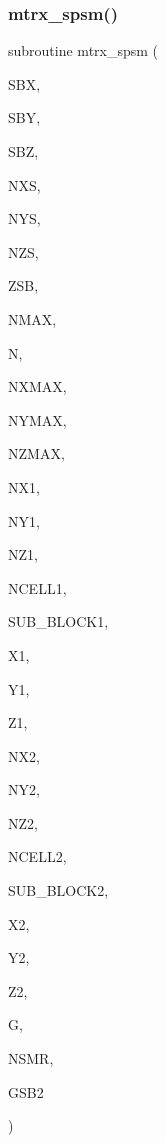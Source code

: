 \subsubsection{\texorpdfstring{mtrx\+\_\+spsm()}{mtrx\_spsm()}}
{\footnotesize\ttfamily subroutine mtrx\+\_\+spsm (\begin{DoxyParamCaption}\item[{real}]{S\+BX,  }\item[{real}]{S\+BY,  }\item[{real}]{S\+BZ,  }\item[{integer}]{N\+XS,  }\item[{integer}]{N\+YS,  }\item[{integer}]{N\+ZS,  }\item[{real}]{Z\+SB,  }\item[{integer}]{N\+M\+AX,  }\item[{integer}]{N,  }\item[{integer}]{N\+X\+M\+AX,  }\item[{integer}]{N\+Y\+M\+AX,  }\item[{integer}]{N\+Z\+M\+AX,  }\item[{integer, dimension(sub\+\_\+block1)}]{N\+X1,  }\item[{integer, dimension(sub\+\_\+block1)}]{N\+Y1,  }\item[{integer, dimension(sub\+\_\+block1)}]{N\+Z1,  }\item[{integer, dimension(sub\+\_\+block1)}]{N\+C\+E\+L\+L1,  }\item[{integer}]{S\+U\+B\+\_\+\+B\+L\+O\+C\+K1,  }\item[{real, dimension(nxmax,sub\+\_\+block1)}]{X1,  }\item[{real, dimension(nymax,sub\+\_\+block1)}]{Y1,  }\item[{real, dimension(nzmax,sub\+\_\+block1)}]{Z1,  }\item[{integer, dimension(sub\+\_\+block2)}]{N\+X2,  }\item[{integer, dimension(sub\+\_\+block2)}]{N\+Y2,  }\item[{integer, dimension(sub\+\_\+block2)}]{N\+Z2,  }\item[{integer, dimension(sub\+\_\+block2)}]{N\+C\+E\+L\+L2,  }\item[{integer}]{S\+U\+B\+\_\+\+B\+L\+O\+C\+K2,  }\item[{real, dimension(nxmax,sub\+\_\+block2)}]{X2,  }\item[{real, dimension(nymax,sub\+\_\+block2)}]{Y2,  }\item[{real, dimension(nzmax,sub\+\_\+block2)}]{Z2,  }\item[{complex, dimension(nmax,n)}]{G,  }\item[{integer}]{N\+S\+MR,  }\item[{complex, dimension(nsmr/3,3)}]{G\+S\+B2 }\end{DoxyParamCaption})}

